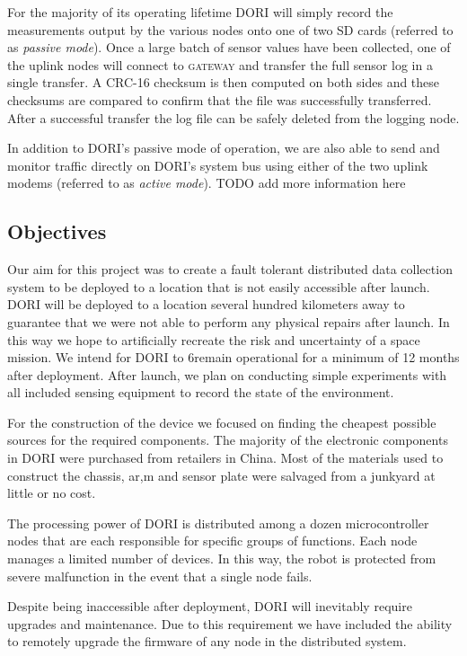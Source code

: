 \documentclass[12pt]{article}
\begin{document}
    For the majority of its operating lifetime DORI will simply record the measurements output by the various nodes onto one of two SD cards (referred to as \emph{passive mode}). Once a large batch of sensor values have been collected, one of the uplink nodes will connect to \textsc{gateway} and transfer the full sensor log in a single transfer. A CRC-16 checksum is then computed on both sides and these checksums are compared to confirm that the file was successfully transferred. After a successful transfer the log file can be safely deleted from the logging node.

    In addition to DORI's passive mode of operation, we are also able to send and monitor traffic directly on DORI's system bus using either of the two uplink modems (referred to as \emph{active mode}). TODO add more information here

\subsection{Objectives}
Our aim for this project was to create a fault tolerant distributed data collection system to be deployed to a location that is not easily accessible after launch. DORI will be deployed to a location several hundred kilometers away to guarantee that we were not able to perform any physical repairs after launch. In this way we hope to artificially recreate the risk and uncertainty of a space mission. We intend for \textsc{DORI} to 6remain operational for a minimum of 12 months after deployment. After launch, we plan on conducting simple experiments with all included sensing equipment to record the state of the environment.

For the construction of the device we focused on finding the cheapest possible sources for the required components. The majority of the electronic components in \textsc{DORI} were purchased from retailers in China. Most of the materials used to construct the chassis, ar,m and sensor plate were salvaged from a junkyard at little or no cost. 

The processing power of \textsc{DORI} is distributed among a dozen microcontroller nodes that are each responsible for specific groups of functions. Each node manages a limited number of devices. In this way, the robot is protected from severe malfunction in the event that a single node fails.

Despite being inaccessible after deployment, \textsc{DORI} will inevitably require upgrades and maintenance. Due to this requirement we have included the ability to remotely upgrade the firmware of any node in the distributed system.
\end{document}
